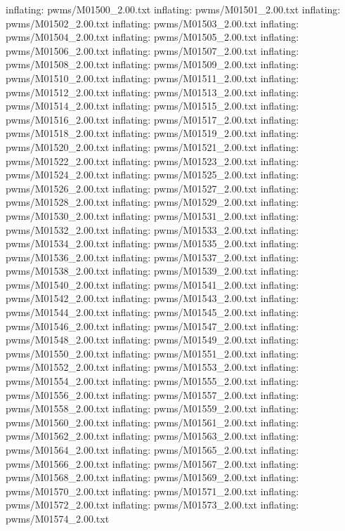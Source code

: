 \documentclass[letterpaper,10pt,english]{sphinxmanual}
\begin{document}
{\begin{sphinxVerbatim}[commandchars=\\\{\}]
  inflating: pwms/M01500\_2.00.txt
  inflating: pwms/M01501\_2.00.txt
  inflating: pwms/M01502\_2.00.txt
  inflating: pwms/M01503\_2.00.txt
  inflating: pwms/M01504\_2.00.txt
  inflating: pwms/M01505\_2.00.txt
  inflating: pwms/M01506\_2.00.txt
  inflating: pwms/M01507\_2.00.txt
  inflating: pwms/M01508\_2.00.txt
  inflating: pwms/M01509\_2.00.txt
  inflating: pwms/M01510\_2.00.txt
  inflating: pwms/M01511\_2.00.txt
  inflating: pwms/M01512\_2.00.txt
  inflating: pwms/M01513\_2.00.txt
  inflating: pwms/M01514\_2.00.txt
  inflating: pwms/M01515\_2.00.txt
  inflating: pwms/M01516\_2.00.txt
  inflating: pwms/M01517\_2.00.txt
  inflating: pwms/M01518\_2.00.txt
  inflating: pwms/M01519\_2.00.txt
  inflating: pwms/M01520\_2.00.txt
  inflating: pwms/M01521\_2.00.txt
  inflating: pwms/M01522\_2.00.txt
  inflating: pwms/M01523\_2.00.txt
  inflating: pwms/M01524\_2.00.txt
  inflating: pwms/M01525\_2.00.txt
  inflating: pwms/M01526\_2.00.txt
  inflating: pwms/M01527\_2.00.txt
  inflating: pwms/M01528\_2.00.txt
  inflating: pwms/M01529\_2.00.txt
  inflating: pwms/M01530\_2.00.txt
  inflating: pwms/M01531\_2.00.txt
  inflating: pwms/M01532\_2.00.txt
  inflating: pwms/M01533\_2.00.txt
  inflating: pwms/M01534\_2.00.txt
  inflating: pwms/M01535\_2.00.txt
  inflating: pwms/M01536\_2.00.txt
  inflating: pwms/M01537\_2.00.txt
  inflating: pwms/M01538\_2.00.txt
  inflating: pwms/M01539\_2.00.txt
  inflating: pwms/M01540\_2.00.txt
  inflating: pwms/M01541\_2.00.txt
  inflating: pwms/M01542\_2.00.txt
  inflating: pwms/M01543\_2.00.txt
  inflating: pwms/M01544\_2.00.txt
  inflating: pwms/M01545\_2.00.txt
  inflating: pwms/M01546\_2.00.txt
  inflating: pwms/M01547\_2.00.txt
  inflating: pwms/M01548\_2.00.txt
  inflating: pwms/M01549\_2.00.txt
  inflating: pwms/M01550\_2.00.txt
  inflating: pwms/M01551\_2.00.txt
  inflating: pwms/M01552\_2.00.txt
  inflating: pwms/M01553\_2.00.txt
  inflating: pwms/M01554\_2.00.txt
  inflating: pwms/M01555\_2.00.txt
  inflating: pwms/M01556\_2.00.txt
  inflating: pwms/M01557\_2.00.txt
  inflating: pwms/M01558\_2.00.txt
  inflating: pwms/M01559\_2.00.txt
  inflating: pwms/M01560\_2.00.txt
  inflating: pwms/M01561\_2.00.txt
  inflating: pwms/M01562\_2.00.txt
  inflating: pwms/M01563\_2.00.txt
  inflating: pwms/M01564\_2.00.txt
  inflating: pwms/M01565\_2.00.txt
  inflating: pwms/M01566\_2.00.txt
  inflating: pwms/M01567\_2.00.txt
  inflating: pwms/M01568\_2.00.txt
  inflating: pwms/M01569\_2.00.txt
  inflating: pwms/M01570\_2.00.txt
  inflating: pwms/M01571\_2.00.txt
  inflating: pwms/M01572\_2.00.txt
  inflating: pwms/M01573\_2.00.txt
  inflating: pwms/M01574\_2.00.txt

\end{sphinxVerbatim}}
\end{document}
